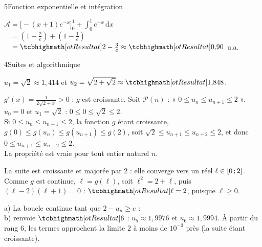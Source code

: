 \begin{corrigeBac}{5}{Fonction exponentielle et intégration}
\begin{questions}[resume]
\begin{codecote}[0.56]
\raggedright
$\mathcal{A}=\Big[-(x+1)e^{-x}\Big]_0^1+\int_0^1e^{-x}\,\mathrm{d}x$\\[1mm]
$\phantom{\mathcal{A}}=\left(1-\frac2e\right)+\left(1-\frac1e\right)$\\[1mm]
$\phantom{\mathcal{A}}=\res{2-\tfrac3e}\approx\res{0{,}90}$ u.a.
\cote
\centering
{}
\end{codecote}
\end{questions}
\end{corrigeBac}

\begin{corrigeBac}{4}{Suites et algorithmique}
\begin{questions}
  \item $u_1=\sqrt2\approx1{,}414$ et $u_2=\sqrt{2+\sqrt2}\approx\res{1{,}848}$. 
  \item $g'(x)=\frac{1}{2\sqrt{2+x}}>0$ : $g$ est croissante. Soit $\mathcal{P}(n)$ : « $0\leq u_n\leq u_{n+1}\leq2$ ».\\
     $u_0=0$ et $u_1=\sqrt2$ : $0\leq0\leq\sqrt2\leq2$.\\
     Si $0\leq u_n\leq u_{n+1}\leq2$, la fonction $g$ étant croissante, $g(0)\leq g(u_n)\leq g(u_{n+1})\leq g(2)$, soit
    $\sqrt2\leq u_{n+1}\leq u_{n+2}\leq2$, et donc $0\leq u_{n+1}\leq u_{n+2}\leq2$.\\
     La propriété est vraie pour tout entier naturel $n$. 
  \item La suite est croissante et majorée par $2$ : elle converge vers un réel $\ell\in\mathopen{[}0\,{;}\,2\mathclose{]}$. Comme $g$ est continue, $\ell=g(\ell)$,
    soit $\ell^2=2+\ell$, puis $(\ell-2)(\ell+1)=0$ : $\res{\ell=2}$, puisque $\ell\geq0$. \pts{1 pt}
  \item a) La boucle continue tant que $2-u_n\geq e$ : \\
    b)  renvoie $\res{6}$ : $u_5\approx1{,}9976$ et $u_6\approx1{,}9994$. À partir du rang $6$, les termes approchent la
    limite $2$ à moins de $10^{-3}$ près (la suite étant croissante). \pts{1 pt}
\end{questions}
\end{corrigeBac}

